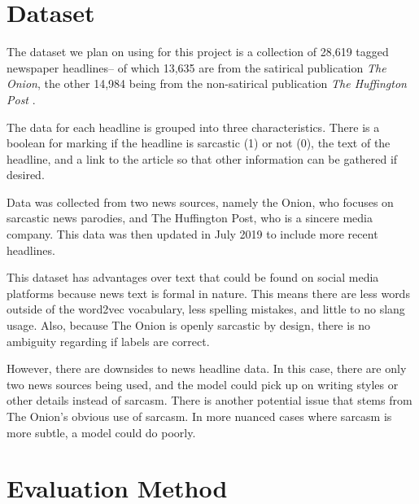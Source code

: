 \documentclass[11pt]{article}
\begin{document}


\section{Dataset}

The dataset we plan on using for this project is a collection of 28,619
tagged newspaper headlines-- of which 13,635 are from the satirical publication
\textit{The Onion}, the other 14,984 being from the non-satirical publication
\textit{The Huffington Post} \cite{misra2023Sarcasm}.

The data for each headline is grouped into three characteristics. There is a boolean
for marking if the headline is sarcastic (1) or not (0), the text of the headline, and
a link to the article so that other information can be gathered if desired.

Data was collected from two news sources, namely the Onion, who focuses on sarcastic
news parodies, and The Huffington Post, who is a sincere media company. This data was
then updated in July 2019 to include more recent headlines.

This dataset has advantages over text that could be found on social
media platforms because news text is formal in nature. This means there
are less words outside of the word2vec vocabulary, less spelling mistakes, 
and little to no slang usage. Also, because The Onion is openly sarcastic 
by design, there is no ambiguity regarding if labels are correct.

However, there are downsides to news headline data. In this case, there are only two news sources
being used, and the model could pick up on writing styles or other details instead of sarcasm.
There is another potential issue that stems from The Onion's obvious use of sarcasm. In more 
nuanced cases where sarcasm is more subtle, a model could do poorly.



\section{Evaluation Method}
\end{document}
